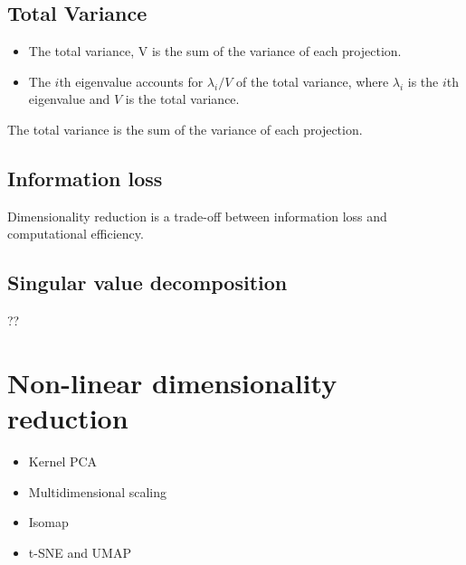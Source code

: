 \documentclass[12pt,a4paper]{article}
\begin{document}
    \subsection{Total Variance}
    \begin{itemize}
        \item The total variance, V is the sum of the variance of each projection.
        \item The $i$th eigenvalue accounts for $\lambda_i/V$ of the total variance, where $\lambda_i$ is the $i$th eigenvalue and $V$ is the total variance.
    \end{itemize}
    The total variance is the sum of the variance of each projection.
    \subsection{Information loss}
    Dimensionality reduction is a trade-off between information loss and computational efficiency. 
    \subsection{Singular value decomposition}
    ??
\section{Non-linear dimensionality reduction}
\begin{itemize}
    \item Kernel PCA
    \item Multidimensional scaling
    \item Isomap
    \item t-SNE and UMAP
\end{itemize}
\end{document}
